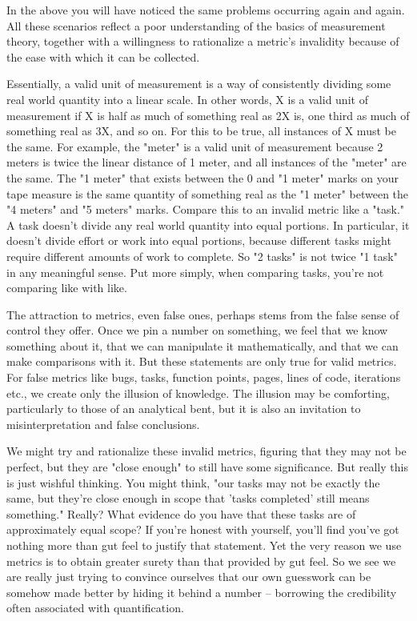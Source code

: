 \documentclass{article}
\begin{document}
\begin{enumerate}
In the above you will have noticed the same problems occurring again and
again. All these scenarios reflect a poor understanding of the basics of
measurement theory, together with a willingness to rationalize a
metric's invalidity because of the ease with which it can be collected.

Essentially, a valid unit of measurement is a way of consistently
dividing some real world quantity into a linear scale. In other words, X
is a valid unit of measurement if X is half as much of something real as
2X is, one third as much of something real as 3X, and so on. For this to
be true, all instances of X must be the same. For example, the "meter"
is a valid unit of measurement because 2 meters is twice the linear
distance of 1 meter, and all instances of the "meter" are the same. The
"1 meter" that exists between the 0 and "1 meter" marks on your tape
measure is the same quantity of something real as the "1 meter" between
the "4 meters" and "5 meters" marks. Compare this to an invalid metric
like a "task." A task doesn't divide any real world quantity into equal
portions. In particular, it doesn't divide effort or work into equal
portions, because different tasks might require different amounts of
work to complete. So "2 tasks" is not twice "1 task" in any meaningful
sense. Put more simply, when comparing tasks, you're not comparing like
with like.

The attraction to metrics, even false ones, perhaps stems from the false
sense of control they offer. Once we pin a number on something, we feel
that we know something about it, that we can manipulate it
mathematically, and that we can make comparisons with it. But these
statements are only true for valid metrics. For false metrics like bugs,
tasks, function points, pages, lines of code, iterations etc., we create
only the illusion of knowledge. The illusion may be comforting,
particularly to those of an analytical bent, but it is also an
invitation to misinterpretation and false conclusions.

We might try and rationalize these invalid metrics, figuring that they
may not be perfect, but they are "close enough" to still have some
significance. But really this is just wishful thinking. You might think,
"our tasks may not be exactly the same, but they're close enough in
scope that 'tasks completed' still means something." Really? What
evidence do you have that these tasks are of approximately equal scope?
If you're honest with yourself, you'll find you've got nothing more than
gut feel to justify that statement. Yet the very reason we use metrics
is to obtain greater surety than that provided by gut feel. So we see we
are really just trying to convince ourselves that our own guesswork can
be somehow made better by hiding it behind a number -- borrowing the
credibility often associated with quantification.


\end{enumerate}
\end{document}
